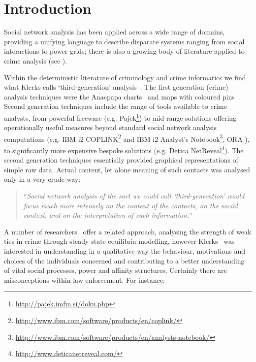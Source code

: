 \documentclass[conference]{IEEEtran}
\theoremstyle{definition}
\begin{document}
\section{Introduction}\label{sec:introduction}
Social network analysis has been applied across a wide range of
domains, providing a unifying language to describe disparate systems
ranging from social interactions to power grids; there is also a
growing body of literature applied to crime analysis (see
\cite{Klerks2001,OatleyZeleznikowLearyEwart2005,OatleyEwartZeleznikow2006,BaronTindall1993,Hansen2005,CalvoArmengolZenou2006,PatacchiniZenou2008,HutchinsBenhamHutchins2009}).

Within the deterministic literature of criminology and crime
informatics we find what Klerks calls `third-generation'
analysis~\cite{Klerks2001}. The first generation (crime) analysis
techniques were the Anacpapa charts~\cite{harper+harris:1975} and maps
with coloured pins~\cite{OatleyEwart2003}. Second generation
techniques include the range of tools available to crime analysts,
from powerful freeware
(e.g. Pajek\footnote{\url{http://pajek.imfm.si/doku.php}}) to
mid-range solutions offering operationally useful measures beyond
standard social network analysis computations (e.g. IBM i2
COPLINK\footnote{\url{http://www.ibm.com/software/products/en/coplink/}}
and IBM i2 Analyst's
Notebook\footnote{\url{http://www.ibm.com/software/products/en/analysts-notebook/}},
ORA \cite{HutchinsBenhamHutchins2009}), to significantly more
expensive bespoke solutions (e.g. Detica
NetReveal\footnote{\url{http://www.deticanetreveal.com/}}). The second
generation techniques essentially provided graphical representations
of simple raw data. Actual content, let alone meaning of such contacts
was analysed only in a very crude way:

\begin{quote}
``{\emph{Social network analysis of the sort we could call `third-generation'
would focus much more intensely on the content of the contacts, on the
social context, and on the interpretation of such
information.}}''~\cite{Klerks2001}
\end{quote}
 
A number of
researchers~\cite{CalvoArmengolVerdierZenou2007,PatacchiniZenou2008}
offer a related approach, analysing the strength of weak ties in crime
through steady state equilibria modelling, however
Klerks~\cite{Klerks2001} was interested in understanding in a
qualitative way the behaviour, motivations and choices of the
individuals concerned and contributing to a better understanding of
vital social processes, power and affinity structures. Certainly there
are misconceptions within law enforcement. For instance:
\end{document}
